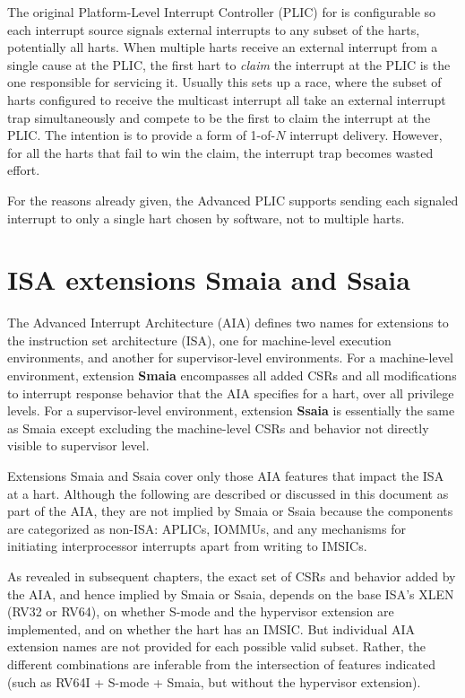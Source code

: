 \begin{commentary}
The original Platform-Level Interrupt Controller (PLIC) for {\RISCV}
is configurable so each interrupt source signals external interrupts to
any subset of the harts, potentially all harts.
When multiple harts receive an external interrupt from a single cause
at the PLIC, the first hart to \emph{claim} the interrupt at the PLIC
is the one responsible for servicing it.
Usually this sets up a race, where the subset of harts configured to
receive the multicast interrupt all take an external interrupt trap
simultaneously and compete to be the first to claim the interrupt at
the PLIC.
The intention is to provide a form of \mbox{1-of-$N$} interrupt
delivery.
However, for all the harts that fail to win the claim, the interrupt
trap becomes wasted effort.

For the reasons already given, the Advanced PLIC supports sending each
signaled interrupt to only a single hart chosen by software, not to
multiple harts.
\end{commentary}

\section{ISA extensions Smaia and Ssaia}

The Advanced Interrupt Architecture (AIA) defines two names for
extensions to the {\RISCV} instruction set architecture (ISA),
one for machine-level execution environments,
and another for supervisor-level environments.
For a machine-level environment, extension \textbf{Smaia} encompasses
all added CSRs and all modifications to interrupt response behavior
that the AIA specifies for a hart, over all privilege levels.
For a supervisor-level environment, extension \textbf{Ssaia} is
essentially the same as Smaia except excluding the machine-level
CSRs and behavior not directly visible to supervisor level.

Extensions Smaia and Ssaia cover only
those AIA features that impact the ISA at a hart.
Although the following are described or discussed
in this document as part of the AIA, they are not implied by
Smaia or Ssaia because the components are categorized as non-ISA:
APLICs, IOMMUs, and any mechanisms for initiating
interprocessor interrupts apart from writing to IMSICs.

As revealed in subsequent chapters, the exact set
of CSRs and behavior added by the AIA, and hence
implied by Smaia or Ssaia, depends on
the base ISA's XLEN (RV32 or RV64), on whether \mbox{S-mode}
and the hypervisor extension are implemented,
and on whether the hart has an IMSIC.
But individual AIA extension names are not
provided for each possible valid subset.
Rather, the different combinations are inferable
from the intersection of features indicated (such as
RV64I + \mbox{S-mode} + Smaia, but without the hypervisor extension).


